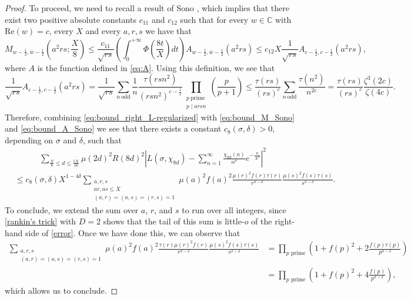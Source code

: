 \documentclass[10pt,a4paper]{amsart}
\theoremstyle{plain}
\theoremstyle{definition}
\theoremstyle{remark}
\begin{document}
\begin{proof}
To proceed, we need to recall a result of Sono \cite[Equation~(4.80)]{sono2020second}, which implies that there exist two positive absolute constants $c_{11}$ and $c_{12}$ such that for every $w \in \mathbb{C}$ with $\mathrm{Re}(w) = c$, every $X$ and every $a,r,s$ we have that
\begin{equation} \label{eq:bound_M_Sono}
    M_{w-\frac{1}{2},\overline{w}-\frac{1}{2}}\left( a^2 r s;\frac{X}{8} \right) \leq \frac{c_{11}}{\sqrt{rs}} \left( \int_0^{+\infty} \Phi\left(\frac{8t}{X}\right) dt \right) A_{w-\frac{1}{2},\overline{w}-\frac{1}{2}}(a^2rs) \leq c_{12} X \frac{1} {\sqrt{rs}} A_{c-\frac{1}{2},c-\frac{1}{2}}(a^2 r s),
\end{equation}
where $A$ is the function defined in \eqref{eq:A}.
Using this definition, we see that
\begin{equation}
\label{eq:bound_A_Sono}
    \frac{1}{\sqrt{rs}} A_{c-\frac{1}{2},c-\frac{1}{2}}(a^2 r s) = \frac{1}{\sqrt{rs}} \sum_{n \ \text{odd}} \frac{1}{n} \frac{\tau(rsn^2)}{(rsn^2)^{c-\frac{1}{2}}} \prod_{\substack{p \ \text{prime} \\p \mid arsn}} \left( \frac{p}{p+1} \right) \leq \frac{\tau(rs)}{(rs)^c} \sum_{n \ \text{odd}} \frac{\tau(n^2)}{n^{2c}} = \frac{\tau(rs)}{(rs)^c} \frac{\zeta^3(2c)}{\zeta(4c)}.
\end{equation}
Therefore, combining \eqref{eq:bound_right_L-regularized} with \eqref{eq:bound_M_Sono} and \eqref{eq:bound_A_Sono} we see that there exists a constant $c_8(\sigma,\delta) > 0$, depending on $\sigma$ and $\delta$, such that
\[
\begin{aligned}
    &\phantom{c_8(\delta)} \sum_{\frac{X}{8}\leq d\leq \frac{5X}{16}}\mu(2d)^2R(8d)^2\left|L(\sigma,\chi_{8d})-\sum_{n=1}^{\infty}\frac{\chi_{8d}(n)}{n^\sigma} e^{-\frac{n}{X^2}}\right|^2 \\ 
    &\leq c_8(\sigma,\delta) X^{1-4\delta} \sum_{\substack{a,r,s\\ar,as\leq X\\(a,r)=(a,s)=(r,s)=1}}
\mu(a)^2f(a)^2\frac{\mu(r)^2f(r)\tau(r)}{r^{\sigma - \delta}}\frac{\mu(s)^2 f(s) \tau(s)}{s^{\sigma - \delta}}.
\end{aligned}
\]
To conclude, we extend the sum over $a$, $r$, and $s$ to run over all integers, since \cref{rankin's trick} with $D=2$ shows that the tail of this sum is little-$o$ of the right-hand side of \eqref{error}. Once we have done this, we can observe that
\[
\begin{aligned}
    \sum_{\substack{a,r,s\\(a,r)=(a,s)=(r,s)=1}}\mu(a)^2f(a)^2\frac{\tau(r)\mu(r)^2f(r)}{r^{\sigma-\delta}}\frac{\mu(s)^2f(s)\tau(s)}{s^{\sigma-\delta}} &= \prod_{p\text{ prime}}\left(1+f(p)^2+ 2\frac{f(p)\tau(p)}{p^{\sigma-\delta}}\right) \\
    &= \prod_{p\text{ prime}}\left(1+f(p)^2+ 4\frac{f(p)}{p^{\sigma-\delta}}\right),
\end{aligned}
\]
which allows us to conclude.
\end{proof}
\end{document}
